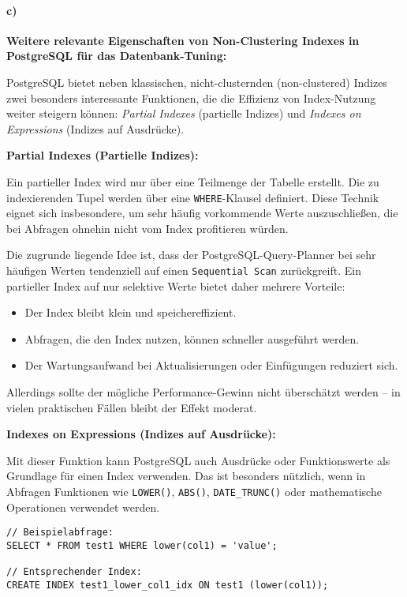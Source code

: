 \documentclass[11pt]{scrartcl}
\begin{document}
\paragraph{c)}

\textbf{Weitere relevante Eigenschaften von Non-Clustering Indexes in PostgreSQL für das Datenbank-Tuning:}

PostgreSQL bietet neben klassischen, nicht-clusternden (non-clustered) Indizes zwei besonders interessante Funktionen, die die Effizienz von Index-Nutzung weiter steigern können: \textit{Partial Indexes} (partielle Indizes) und \textit{Indexes on Expressions} (Indizes auf Ausdrücke).

\vspace{0.5em}
\noindent\textbf{Partial Indexes (Partielle Indizes):}

Ein partieller Index wird nur über eine Teilmenge der Tabelle erstellt. Die zu indexierenden Tupel werden über eine \texttt{WHERE}-Klausel definiert. Diese Technik eignet sich insbesondere, um sehr häufig vorkommende Werte auszuschließen, die bei Abfragen ohnehin nicht vom Index profitieren würden.

Die zugrunde liegende Idee ist, dass der PostgreSQL-Query-Planner bei sehr häufigen Werten tendenziell auf einen \texttt{Sequential Scan} zurückgreift. Ein partieller Index auf nur selektive Werte bietet daher mehrere Vorteile:

\begin{itemize}
  \item Der Index bleibt klein und speichereffizient.
  \item Abfragen, die den Index nutzen, können schneller ausgeführt werden.
  \item Der Wartungsaufwand bei Aktualisierungen oder Einfügungen reduziert sich.
\end{itemize}

Allerdings sollte der mögliche Performance-Gewinn nicht überschätzt werden – in vielen praktischen Fällen bleibt der Effekt moderat.

\vspace{0.5em}
\noindent\textbf{Indexes on Expressions (Indizes auf Ausdrücke):}

Mit dieser Funktion kann PostgreSQL auch Ausdrücke oder Funktionswerte als Grundlage für einen Index verwenden. Das ist besonders nützlich, wenn in Abfragen Funktionen wie \texttt{LOWER()}, \texttt{ABS()}, \texttt{DATE\_TRUNC()} oder mathematische Operationen verwendet werden.

\begin{lstlisting}[style=dbtsql]
// Beispielabfrage:
SELECT * FROM test1 WHERE lower(col1) = 'value';

// Entsprechender Index:
CREATE INDEX test1_lower_col1_idx ON test1 (lower(col1));
\end{lstlisting}
\end{document}
